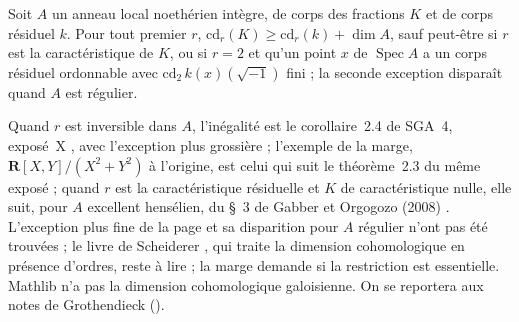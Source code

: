 \begin{encadre}
\begin{theoreme*}\nonverifie
Soit $A$ un anneau local noethérien intègre, de corps des fractions $K$ et de corps résiduel $k$. Pour tout premier $r$, $\mathrm{cd}_r(K) \geq \mathrm{cd}_r(k) + \dim A$, sauf peut-être si $r$ est la caractéristique de $K$, ou si $r = 2$ et qu'un point $x$ de $\operatorname{Spec} A$ a un corps résiduel ordonnable avec $\mathrm{cd}_2\, k(x)(\sqrt{-1})$ fini ; la seconde exception disparaît quand $A$ est régulier.
\end{theoreme*}
\end{encadre}
{\small Quand $r$ est inversible dans $A$, l'inégalité est le corollaire~2.4 de SGA~4, exposé~X \cite{sga4-3}, avec l'exception plus grossière  ; l'exemple de la marge, $\mathbf R[X,Y]/(X^2+Y^2)$ à l'origine, est celui qui suit le théorème~2.3 du même exposé ; quand $r$ est la caractéristique résiduelle et $K$ de caractéristique nulle, elle suit, pour $A$ excellent hensélien, du §~3 de Gabber et Orgogozo (2008) \cite{gabberorgogozo2008}. L'exception plus fine de la page et sa disparition pour $A$ régulier n'ont pas été trouvées ; le livre de Scheiderer \cite{scheiderer1994}, qui traite la dimension cohomologique en présence d'ordres, reste à lire ; la marge demande si la restriction est essentielle. Mathlib n'a pas la dimension cohomologique galoisienne. On se reportera aux notes de Grothendieck ().\par}
